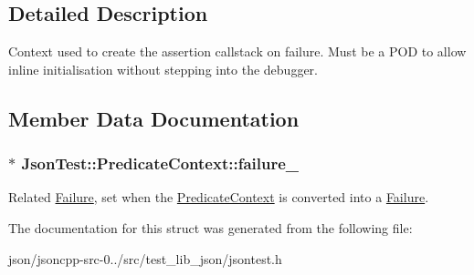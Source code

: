 \subsection{Detailed Description}
Context used to create the assertion callstack on failure. Must be a P\+O\+D to allow inline initialisation without stepping into the debugger. 

\subsection{Member Data Documentation}
\hypertarget{struct_json_test_1_1_predicate_context_a66ab1637a70a09a0cc7eae43f0fcd3ed}{
\subsubsection[{failure\+\_\+}]{$\ast$ Json\+Test\+::\+Predicate\+Context\+::failure\+\_\+}}\label{struct_json_test_1_1_predicate_context_a66ab1637a70a09a0cc7eae43f0fcd3ed}
Related \hyperlink{class_json_test_1_1_failure}{Failure}, set when the \hyperlink{struct_json_test_1_1_predicate_context}{Predicate\+Context} is converted into a \hyperlink{class_json_test_1_1_failure}{Failure}. 

The documentation for this struct was generated from the following file\+:\begin{DoxyCompactItemize}
\item 
json/jsoncpp-\/src-\/0../src/test\+\_\+lib\+\_\+json/jsontest.\+h\end{DoxyCompactItemize}
